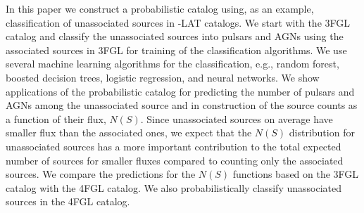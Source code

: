 In this paper we construct a probabilistic catalog using, as an example, classification of unassociated sources in \Fermi-LAT catalogs. 
We start with the 3FGL catalog and classify the unassociated sources into pulsars and AGNs using the associated sources in 3FGL for training of the classification algorithms.
We use several machine learning algorithms for the classification, e.g., random forest, boosted decision trees, logistic regression,
and neural networks.
We show applications of the probabilistic catalog for predicting the number of pulsars and AGNs among the unassociated source and in construction of the source counts as a function of their flux, $N(S)$.
Since unassociated sources on average have smaller flux than the associated ones, 
we expect that the $N(S)$ distribution for unassociated sources has a more important contribution to the total expected number of sources
for smaller fluxes compared to counting only the associated sources.
We compare the predictions for the $N(S)$ functions based on the 3FGL catalog with the 4FGL catalog.
We also probabilistically classify unassociated sources in the 4FGL catalog.


